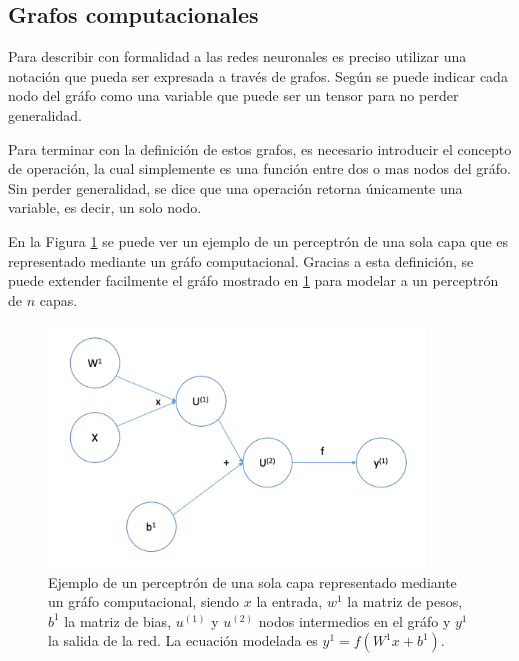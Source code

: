 	\subsection{Grafos computacionales}
	Para describir con formalidad a las redes neuronales es preciso utilizar una notación que pueda ser expresada a través de grafos. Según \cite{deeplearningbook} se puede indicar cada nodo del gráfo como una variable que puede ser un tensor para no perder generalidad. 
	
	Para terminar con la definición de estos grafos, es necesario introducir el concepto de operación, la cual simplemente es una función entre dos o mas nodos del gráfo. Sin perder generalidad, se dice que una operación retorna únicamente una variable, es decir, un solo nodo.
	
	En la Figura \ref{fig:grafo-computacional} se puede ver un ejemplo de un perceptrón de una sola capa que es representado mediante un gráfo computacional. Gracias a esta definición, se puede extender facilmente el gráfo mostrado en \ref{fig:grafo-computacional} para modelar a un perceptrón de $n$ capas.
	
	\begin{figure}[h]
		\centering
		\includegraphics[width=10cm]{capitulo2/images/grafo}
		\caption{Ejemplo de un perceptrón de una sola capa representado mediante un gráfo computacional, siendo $x$ la entrada, $w^{1}$ la matriz de pesos, $b^{1}$ la matriz de bias, $u^{(1)}$ y $u^{(2)}$ nodos intermedios en el gráfo y $y^{1}$ la salida de la red. La ecuación modelada es $y ^ {1} = f(W^{1}x + b ^ {1})$.}
		\label{fig:grafo-computacional}
	\end{figure}



